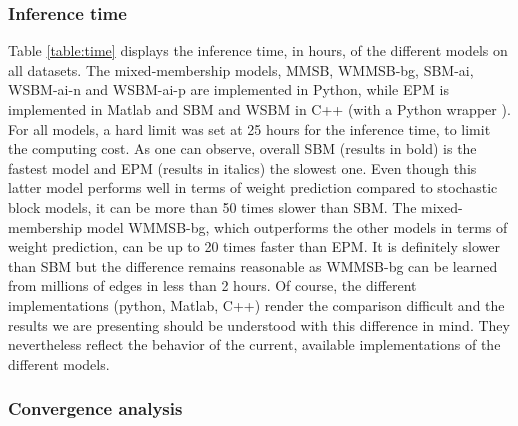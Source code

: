 \begin{table*}[t]
\centering
	
\label{table:time}
\end{table*}

\subsubsection{Inference time} 

\begin{figure*}[t]
\centering
	
    \label{fig:conv_entropy}
\end{figure*}

Table \ref{table:time} displays the inference time, in hours, of the different models on all datasets. The mixed-membership models, MMSB, WMMSB-bg,  SBM-ai, WSBM-ai-n and WSBM-ai-p are implemented in Python, while  EPM is implemented in Matlab and SBM and WSBM in C++ (with a Python wrapper \cite{peixoto_graph-tool_2014}). For all models, a hard limit was set at 25 hours for the inference time, to limit the computing cost. As one can observe, overall SBM (results in bold) is the fastest model and EPM (results in italics) the slowest one. Even though this latter model performs well in terms of weight prediction compared to stochastic block models, it can be more than 50 times slower than SBM. The mixed-membership model WMMSB-bg, which outperforms the other models in terms of weight prediction, can be up to 20 times faster than EPM. It is definitely slower than SBM but the difference remains reasonable as WMMSB-bg can be learned from millions of edges in less than 2 hours. Of course, the different implementations (python, Matlab, C++) render the comparison difficult and the results we are presenting should be understood with this difference in mind. They nevertheless reflect the behavior of the current, available implementations of the different models.

\subsubsection{Convergence analysis} 

